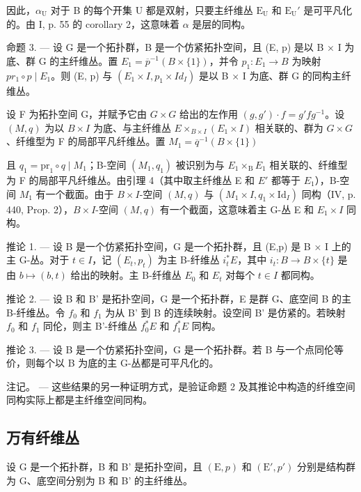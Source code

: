 因此，\(\alpha_{\mathrm{U}}\) 对于 B 的每个开集 U 都是双射，只要主纤维丛 \(\mathrm{E_U}\) 和 \(\mathrm{E_U}'\) 是可平凡化的。由 I, p. 55 的 corollary 2，这意味着 \(\alpha\) 是层的同构。

命题 3. --- 设 G 是一个拓扑群，B 是一个仿紧拓扑空间，且 (E, p) 是以 B × I 为底、群 G 的主纤维丛。置 \(E_{1} = \overline{p}^{-1}(B \times \{1\})\)，并令 \(p_{1}: E_{1} \to B\) 为映射 \(pr_{1} \circ p \mid E_{1}\)。则 (E, p) 与 \((E_{1} \times I, p_{1} \times Id_{I})\) 是以 B × I 为底、群 G 的同构主纤维丛。

设 F 为拓扑空间 G，并赋予它由 \(G \times G\) 给出的左作用 \((g, g') \cdot f = g' fg^{-1}\)。设 \((M, q)\) 为以 \(B \times I\) 为底、与主纤维丛 \(E \times_{B \times I}(E_1 \times I)\) 相关联的、群为 \(G \times G\)、纤维型为 F 的局部平凡纤维丛。置 \(M_1 = \overline{q}^{-1}(B \times \{1\})\)

且 \(q_1 = \mathrm{pr}_1 \circ q \mid M_1\)；B-空间 \((M_1, q_1)\) 被识别为与 \(E_1 \times_\mathrm{B} E_1\) 相关联的、纤维型为 F 的局部平凡纤维丛。由引理 4（其中取主纤维丛 E 和 \(E'\) 都等于 \(E_1\)），B-空间 \(M_1\) 有一个截面。由于 \(B \times I\)-空间 \((M, q)\) 与 \((M_1 \times I, q_1 \times \mathrm{Id}_{I})\) 同构（IV, p. 440, Prop. 2），\(B \times I\)-空间 \((M, q)\) 有一个截面，这意味着主 G-丛 E 和 \(E_1 \times I\) 同构。

推论 1. --- 设 B 是一个仿紧拓扑空间，G 是一个拓扑群，且 (E,p) 是 B × I 上的主 G-丛。对于 \(t \in I\)，记 \((E_{t}, p_{t})\) 为主 B-纤维丛 \(i_{t}^{*}E\)，其中 \(i_{t}: B \to B \times \{t\}\) 是由 \(b \mapsto (b, t)\) 给出的映射。主 B-纤维丛 \(E_{0}\) 和 \(E_{t}\) 对每个 \(t \in I\) 都同构。

推论 2. --- 设 B 和 B' 是拓扑空间，G 是一个拓扑群，E 是群 G、底空间 B 的主 B-纤维丛。令 \(f_0\) 和 \(f_1\) 为从 B' 到 B 的连续映射。设空间 B' 是仿紧的。若映射 \(f_0\) 和 \(f_1\) 同伦，则主 B'-纤维丛 \(f_0^*E\) 和 \(f_1^*E\) 同构。

推论 3. --- 设 B 是一个仿紧拓扑空间，G 是一个拓扑群。若 B 与一个点同伦等价，则每个以 B 为底的主 G-丛都是可平凡化的。

注记。 --- 这些结果的另一种证明方式，是验证命题 2 及其推论中构造的纤维空间同构实际上都是主纤维空间同构。

\subsection{万有纤维丛}

设 G 是一个拓扑群，B 和 B' 是拓扑空间，且 \((\mathrm{E}, p)\) 和 \((\mathrm{E}', p')\) 分别是结构群为 G、底空间分别为 B 和 B' 的主纤维丛。


